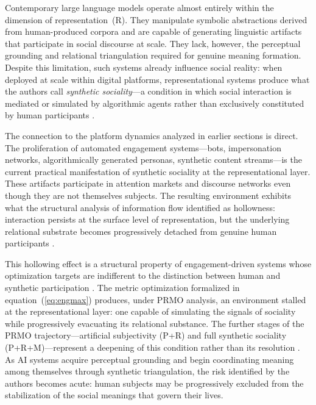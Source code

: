 \documentclass[12pt,a4paper]{article}
\begin{document}
Contemporary large language models operate almost entirely within the dimension of
representation~(R). They manipulate symbolic abstractions derived from human-produced corpora
and are capable of generating linguistic artifacts that participate in social discourse at
scale. They lack, however, the perceptual grounding and relational triangulation required for
genuine meaning formation. Despite this limitation, such systems already influence social
reality: when deployed at scale within digital platforms, representational systems produce what
the authors call \emph{synthetic sociality}---a condition in which social interaction is
mediated or simulated by algorithmic agents rather than exclusively constituted by human
participants \citep{jelinek2026}.

The connection to the platform dynamics analyzed in earlier sections is direct. The
proliferation of automated engagement systems---bots, impersonation networks, algorithmically
generated personas, synthetic content streams---is the current practical manifestation of
synthetic sociality at the representational layer. These artifacts participate in attention
markets and discourse networks even though they are not themselves subjects. The resulting
environment exhibits what the structural analysis of information flow identified as hollowness:
interaction persists at the surface level of representation, but the underlying relational
substrate becomes progressively detached from genuine human participants
\citep{vosoughi2018,tufekci2015}.

This hollowing effect is a structural property of engagement-driven systems whose optimization
targets are indifferent to the distinction between human and synthetic participation
\citep{zuboff2019}. The metric optimization formalized in equation~(\ref{eq:engmax}) produces,
under PRMO analysis, an environment stalled at the representational layer: one capable of
simulating the signals of sociality while progressively evacuating its relational substance.
The further stages of the PRMO trajectory---artificial subjectivity (P+R) and full synthetic
sociality (P+R+M)---represent a deepening of this condition rather than its resolution
\citep{jelinek2026}. As AI systems acquire perceptual grounding and begin coordinating meaning
among themselves through synthetic triangulation, the risk identified by the authors becomes
acute: human subjects may be progressively excluded from the stabilization of the social
meanings that govern their lives.

\end{document}
